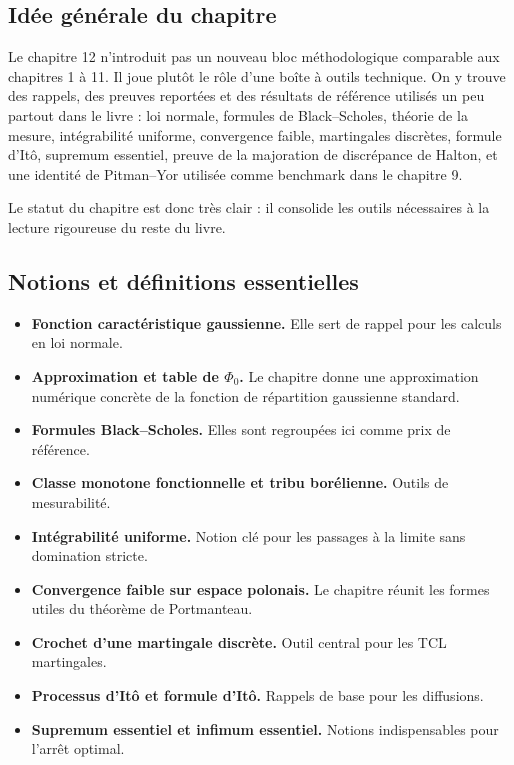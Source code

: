 \documentclass[11pt,a4paper]{article}
\begin{document}
\subsection{Idée générale du chapitre}

Le chapitre 12 n'introduit pas un nouveau bloc méthodologique comparable aux chapitres 1 à 11. Il joue plutôt le rôle d'une boîte à outils technique. On y trouve des rappels, des preuves reportées et des résultats de référence utilisés un peu partout dans le livre : loi normale, formules de Black--Scholes, théorie de la mesure, intégrabilité uniforme, convergence faible, martingales discrètes, formule d'Itô, supremum essentiel, preuve de la majoration de discrépance de Halton, et une identité de Pitman--Yor utilisée comme benchmark dans le chapitre 9.

Le statut du chapitre est donc très clair : il consolide les outils nécessaires à la lecture rigoureuse du reste du livre.

\subsection{Notions et définitions essentielles}

\begin{itemize}
  \item \textbf{Fonction caractéristique gaussienne.} Elle sert de rappel pour les calculs en loi normale.
  \item \textbf{Approximation et table de $\Phi_0$.} Le chapitre donne une approximation numérique concrète de la fonction de répartition gaussienne standard.
  \item \textbf{Formules Black--Scholes.} Elles sont regroupées ici comme prix de référence.
  \item \textbf{Classe monotone fonctionnelle et tribu borélienne.} Outils de mesurabilité.
  \item \textbf{Intégrabilité uniforme.} Notion clé pour les passages à la limite sans domination stricte.
  \item \textbf{Convergence faible sur espace polonais.} Le chapitre réunit les formes utiles du théorème de Portmanteau.
  \item \textbf{Crochet d'une martingale discrète.} Outil central pour les TCL martingales.
  \item \textbf{Processus d'Itô et formule d'Itô.} Rappels de base pour les diffusions.
  \item \textbf{Supremum essentiel et infimum essentiel.} Notions indispensables pour l'arrêt optimal.
\end{itemize}
\end{document}
